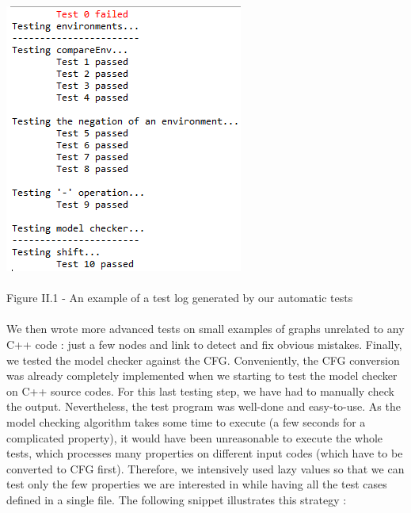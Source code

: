 \documentclass{report}
\begin{document}
\begin{center}
\includegraphics[scale=0.7]{data/test-log}
~\\~\\Figure II.1 - An example of a test log generated by our automatic tests
\end{center}

\paragraph{}
\hspace{4mm}We then wrote more advanced tests on small examples of graphs unrelated to any C++ code : just a few nodes and link to detect and fix obvious mistakes.
Finally, we tested the model checker against the CFG. Conveniently, the CFG conversion was already completely implemented when we starting to test the
model checker on C++ source codes. For this last testing step, we have had to manually check the output. Nevertheless, the test program was well-done and
easy-to-use. As the model checking algorithm takes some time to execute (a few seconds for a complicated property), it would have been unreasonable to execute the whole
tests, which processes many properties on different input codes (which have to be converted to CFG first). Therefore, we intensively used lazy values so that we can
test only the few properties we are interested in while having all the test cases defined in a single file.
The following snippet illustrates this strategy :
\end{document}
